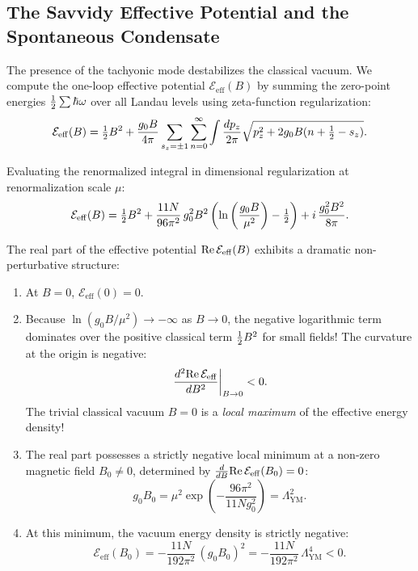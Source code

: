\subsection{The Savvidy Effective Potential and the Spontaneous Condensate}
\label{subsec:savvidy_effective_potential}

The presence of the tachyonic mode destabilizes the classical vacuum. We compute the one-loop effective potential $\mathcal{E}_{\mathrm{eff}}(B)$ by summing the zero-point energies $\tfrac{1}{2} \sum \hbar \omega$ over all Landau levels using zeta-function regularization:
\begin{equation}
\label{eq:ch10_sum_zero_point}
\mathcal{E}_{\mathrm{eff}}(B) = \tfrac{1}{2} B^2 + \frac{g_0 B}{4\pi} \sum_{s_z = \pm 1} \sum_{n=0}^\infty \int \frac{dp_z}{2\pi} \sqrt{p_z^2 + 2 g_0 B (n + \tfrac{1}{2} - s_z)}.
\end{equation}

Evaluating the renormalized integral in dimensional regularization at renormalization scale $\mu$:
\begin{equation}
\label{eq:savvidy_effective_potential}
\mathcal{E}_{\mathrm{eff}}(B) = \tfrac{1}{2} B^2 + \frac{11 N}{96 \pi^2} \, g_0^2 B^2 \left( \ln\left( \frac{g_0 B}{\mu^2} \right) - \tfrac{1}{2} \right) + i \, \frac{g_0^2 B^2}{8 \pi}.
\end{equation}

The real part of the effective potential $\mathrm{Re} \, \mathcal{E}_{\mathrm{eff}}(B)$ exhibits a dramatic non-perturbative structure:
\begin{enumerate}
    \item At $B = 0$, $\mathcal{E}_{\mathrm{eff}}(0) = 0$.
    \item Because $\ln(g_0 B / \mu^2) \to -\infty$ as $B \to 0$, the negative logarithmic term dominates over the positive classical term $\tfrac{1}{2} B^2$ for small fields! The curvature at the origin is negative:
    \begin{equation}
    \left. \frac{d^2 \mathrm{Re} \, \mathcal{E}_{\mathrm{eff}}}{dB^2} \right|_{B \to 0} < 0.
    \end{equation}
    The trivial classical vacuum $B = 0$ is a \emph{local maximum} of the effective energy density!
    \item The real part possesses a strictly negative local minimum at a non-zero magnetic field $B_0 \neq 0$, determined by $\frac{d}{dB} \mathrm{Re} \, \mathcal{E}_{\mathrm{eff}}(B_0) = 0$:
    \begin{equation}
    \label{eq:ch10_savvidy_minimum}
    g_0 B_0 = \mu^2 \exp\left( -\frac{96\pi^2}{11 N g_0^2} \right) = \Lambda_{\mathrm{YM}}^2.
    \end{equation}
    \item At this minimum, the vacuum energy density is strictly negative:
    \begin{equation}
    \label{eq:ch10_negative_vacuum_energy}
    \mathcal{E}_{\mathrm{eff}}(B_0) = -\frac{11 N}{192 \pi^2} \, (g_0 B_0)^2 = -\frac{11 N}{192 \pi^2} \, \Lambda_{\mathrm{YM}}^4 < 0.
    \end{equation}
\end{enumerate}

